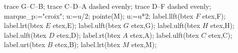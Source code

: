 \begin{corrige}
\begin{enumerate}
\begin{center}
\begin{Geometrie}[CoinBG={(.5u,.5u)},CoinHD={(5u,4u)}]
                trace G--C--B;
                trace C--D--A dashed evenly;
                trace D--F dashed evenly;
                marque_p:="croix";
                u:=u/2;
                pointe(M);
                u:=u*2;
                label.llft(btex $F$ etex,F);
                label.lrt(btex $E$ etex,E);
                label.ulft(btex $G$ etex,G);
                label.ulft(btex $H$ etex,H);
                label.ulft(btex $D$ etex,D);
                label.rt(btex $A$ etex,A);
                label.ulft(btex $C$ etex,C);
                label.urt(btex $B$ etex,B);
                label.lrt(btex $M$ etex,M);
            \end{Geometrie}
        \end{center}
    \end{enumerate}
\end{corrige}
